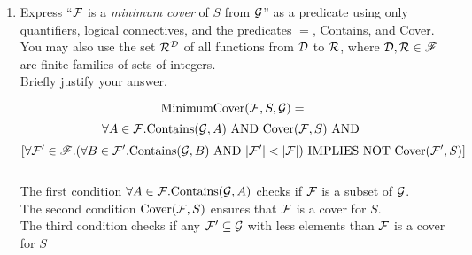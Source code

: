 \documentclass[11pt]{article}
\newcommand{\Implies}{\mbox{ IMPLIES }}
\newcommand{\And}{\mbox{ AND }}
\newcommand{\Not}{\mbox{NOT }}
\begin{document}
\begin{enumerate}
\begin{enumerate}
\item
\begin{question}
Express ``${\cal F}$ is a {\em minimum cover} of $S$ from ${\cal G}$'' as a predicate using
only quantifiers, logical connectives, and the predicates $=$, Contains, and Cover.\\
You may also use the set
${\cal R}^{\cal D}$
of all functions from ${\cal D}$ to ${\cal R}$,
where ${\cal D}, {\cal R} \in \mathscr{F}$ are finite families of sets of integers.\\
Briefly justify your answer.
\end{question}

\begin{solution}
$${\rm MinimumCover}({\cal F}, S, {\cal G})=$$
$$ \forall A\in{\cal F}.{\rm Contains}({\cal G}, A)\And {\rm Cover}({\cal F}, S) \And $$
$$[\forall{\cal F'}\in\mathscr{F}. (\forall B\in {\cal F'}.{\rm Contains}({\cal G}, B)\And |{\cal F'}| < |{\cal F}|) \Implies \Not {\rm Cover}({\cal F'}, S)]$$\\
The first condition $\forall A\in{\cal F}.{\rm Contains}({\cal G}, A)$ checks if ${\cal F}$ is a subset of ${\cal G}$.\\
The second condition ${\rm Cover}({\cal F}, S)$ ensures that ${\cal F}$ is a cover for $S$.\\
The third condition checks if any ${\cal F'}\subseteq {\cal G}$ with less elements than ${\cal F}$ is a cover for $S$
\end{solution}
\end{enumerate}
\end{enumerate}
\end{document}
